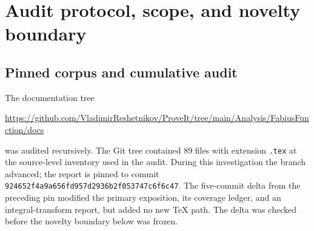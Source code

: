 \documentclass[11pt]{article}
\theoremstyle{definition}
\theoremstyle{remark}
\begin{document}
\begin{abstract}
A second positive approximation is obtained by differentiating the Bernstein
polynomial of $F$: $p$ is the uniform limit of finite mixtures of beta densities
with rational weights $\Delta_{N,k}$.  Its moment-generating and Fourier
transforms are therefore limits of positive rational mixtures of confluent
hypergeometric functions.  A dual construction uses dyadic values of the inverse
$G=F^{-1}$: equal probability cells with variable spatial widths give a finite
sinc-mixture formula for $\FourierTwoPi{\RvachevUp}$, as well as polynomial limits for all
moments.

Finally, the exact Haar detail energy $E_N$ is rational and has an all-orders
continuum expansion
\[
 E_N\sim \frac{h^2}{16}\|p'\|_2^2-
             \frac{h^4}{384}\|p''\|_2^2+
             \frac{h^6}{20480}\|p'''\|_2^2-\cdots,
 \qquad h=2^{-N}.
\]
The complete coefficient sequence is generated by $\SincRad^4$, hence by complete
Bell polynomials in Bernoulli numbers.  The beyond-all-orders aliasing remainder
provides a new place where the known log-periodic Fourier decay should reappear.
The report distinguishes repository input, results proved here, numerical checks,
and conjectures; ``new'' always means new relative to the audited repository
corpus, not an assertion of worldwide priority.
\end{abstract}


\clearpage

\section{Audit protocol, scope, and novelty boundary}
\label{p3:sec:audit}

\subsection{Pinned corpus and cumulative audit}

The documentation tree
\begin{center}
\url{https://github.com/VladimirReshetnikov/ProveIt/tree/main/Analysis/FabiusFunction/docs}
\end{center}
was audited recursively.  The Git tree contained $89$ files with extension
\texttt{.tex} at the source-level inventory used in the audit.  During this
investigation the branch advanced; the report is pinned to commit
\nolinkurl{924652f4a9a656fd957d2936b2f053747c6f6c47}.  The five-commit delta from
the preceding pin modified the primary exposition, its coverage ledger, and an
integral-transform report, but added no new TeX path.  The delta was checked
before the novelty boundary below was frozen.
\end{document}
